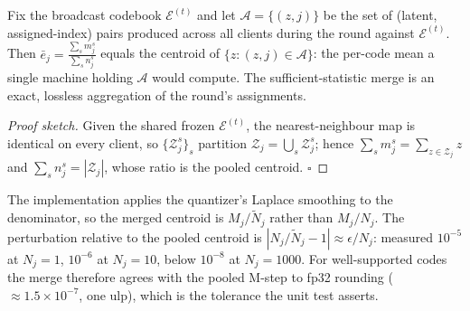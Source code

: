 \begin{proposition}
\label{prop:exact}
Fix the broadcast codebook $\mathcal{E}^{(t)}$ and let $\mathcal{A}=\{(z,j)\}$ be the set
of (latent, assigned-index) pairs produced across all clients during the round against
$\mathcal{E}^{(t)}$. Then
$\displaystyle \bar e_j=\frac{\sum_{s} m^{s}_{j}}{\sum_{s} n^{s}_{j}}$
equals the centroid of $\{z:(z,j)\in\mathcal{A}\}$: the per-code mean a single machine
holding $\mathcal{A}$ would compute. The sufficient-statistic merge is an exact, lossless
aggregation of the round's assignments.
\end{proposition}
\begin{proof}[Proof sketch]
Given the shared frozen $\mathcal{E}^{(t)}$, the nearest-neighbour map is identical on
every client, so $\{\mathcal{Z}^{s}_{j}\}_s$ partition
$\mathcal{Z}_j=\bigcup_s\mathcal{Z}^{s}_{j}$; hence $\sum_s m^{s}_{j}=\sum_{z\in\mathcal{Z}_j}z$
and $\sum_s n^{s}_{j}=|\mathcal{Z}_j|$, whose ratio is the pooled centroid. $\square$
\end{proof}

\begin{remark}
\label{rem:smoothing}
The implementation applies the quantizer's Laplace smoothing to the denominator, so the
merged centroid is $M_j/\tilde{N}_j$ rather than $M_j/N_j$. The perturbation relative to the
pooled centroid is $|N_j/\tilde{N}_j-1|\approx\epsilon/N_j$: measured $10^{-5}$ at $N_j{=}1$,
$10^{-6}$ at $N_j{=}10$, below $10^{-8}$ at $N_j{=}1000$. For well-supported codes the merge
therefore agrees with the pooled M-step to fp32 rounding ($\approx 1.5\times10^{-7}$,
one ulp), which is the tolerance the unit test asserts.
\end{remark}

